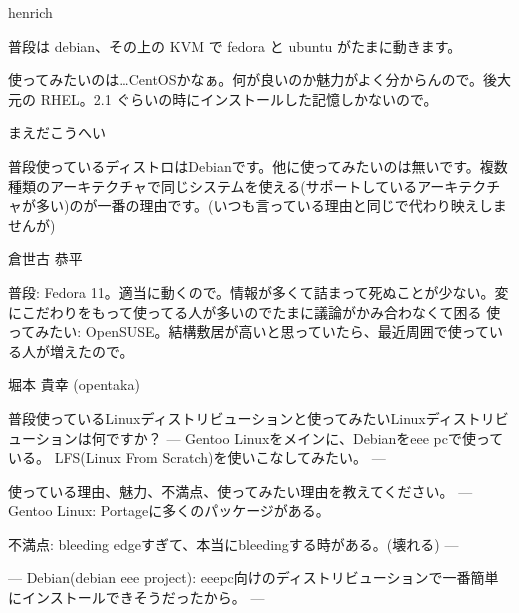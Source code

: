 \begin{prework}{ henrich }

普段は debian、その上の KVM で fedora と ubuntu がたまに動きます。

使ってみたいのは…CentOSかなぁ。何が良いのか魅力がよく分からんので。後大元の RHEL。2.1 ぐらいの時にインストールした記憶しかないので。

\end{prework}



\begin{prework}{ まえだこうへい }

普段使っているディストロはDebianです。他に使ってみたいのは無いです。複数種類のアーキテクチャで同じシステムを使える(サポートしているアーキテクチャが多い)のが一番の理由です。(いつも言っている理由と同じで代わり映えしませんが)

\end{prework}



\begin{prework}{ 倉世古 恭平 }

普段: Fedora 11。適当に動くので。情報が多くて詰まって死ぬことが少ない。変にこだわりをもって使ってる人が多いのでたまに議論がかみ合わなくて困る
使ってみたい: OpenSUSE。結構敷居が高いと思っていたら、最近周囲で使っている人が増えたので。

\end{prework}



\begin{prework}{ 堀本 貴幸 (opentaka) }

普段使っているLinuxディストリビューションと使ってみたいLinuxディストリビューションは何ですか？
---
Gentoo Linuxをメインに、Debianをeee pcで使っている。
LFS(Linux From Scratch)を使いこなしてみたい。
---

使っている理由、魅力、不満点、使ってみたい理由を教えてください。
---
Gentoo Linux: 
Portageに多くのパッケージがある。

不満点: bleeding edgeすぎて、本当にbleedingする時がある。(壊れる)
---

---
Debian(debian eee project): 
eeepc向けのディストリビューションで一番簡単にインストールできそうだったから。
---

\end{prework}


